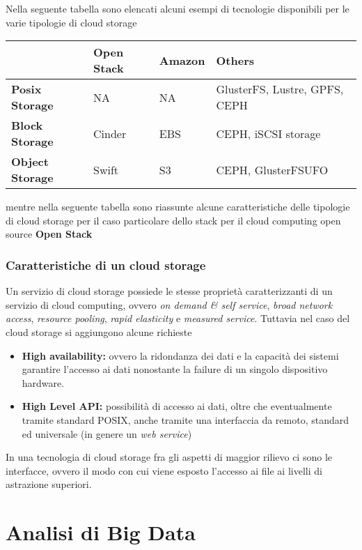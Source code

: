\documentclass[italian,]{article}
\providecommand{\tightlist}{%
  \setlength{\itemsep}{0pt}\setlength{\parskip}{0pt}}
\begin{document}
Nella seguente tabella sono elencati alcuni esempi di tecnologie
disponibili per le varie tipologie di cloud storage

\begin{longtable}[]{@{}llll@{}}
\toprule
& \textbf{Open Stack} & \textbf{Amazon} & \textbf{Others}\tabularnewline
\midrule
\endhead
\textbf{Posix Storage} & NA & NA & GlusterFS, Lustre, GPFS,
CEPH\tabularnewline
\textbf{Block Storage} & Cinder & EBS & CEPH, iSCSI
storage\tabularnewline
\textbf{Object Storage} & Swift & S3 & CEPH, GlusterFSUFO\tabularnewline
\bottomrule
\end{longtable}

mentre nella seguente tabella sono riassunte alcune caratteristiche
delle tipologie di cloud storage per il caso particolare dello stack per
il cloud computing open source \textbf{Open Stack}

\subsubsection{Caratteristiche di un cloud
storage}\label{caratteristiche-di-un-cloud-storage}

Un servizio di cloud storage possiede le stesse proprietà
caratterizzanti di un servizio di cloud computing, ovvero \emph{on
demand \& self service}, \emph{broad network access}, \emph{resource
pooling}, \emph{rapid elasticity} e \emph{measured service}. Tuttavia
nel caso del cloud storage si aggiungono alcune richieste

\begin{itemize}
\tightlist
\item
  \textbf{High availability:} ovvero la ridondanza dei dati e la
  capacità dei sistemi garantire l'accesso ai dati nonostante la failure
  di un singolo dispositivo hardware.
\item
  \textbf{High Level API:} possibilità di accesso ai dati, oltre che
  eventualmente tramite standard POSIX, anche tramite una interfaccia da
  remoto, standard ed universale (in genere un \emph{web service})
\end{itemize}

In una tecnologia di cloud storage fra gli aspetti di maggior rilievo ci
sono le interfacce, ovvero il modo con cui viene esposto l'accesso ai
file ai livelli di astrazione superiori.

\section{Analisi di Big Data}\label{analisi-di-big-data}
\end{document}
